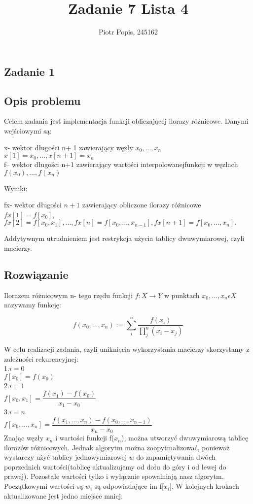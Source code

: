 \documentclass[11pt]{article}
\begin{document}
\title{Zadanie 7 Lista 4}
\author{Piotr Popis, 245162}
\maketitle
\centering

\begin{flushleft}
\section{Zadanie 1}
\subsection{Opis problemu}
Celem zadania jest implementacja funkcji obliczającej ilorazy różnicowe. Danymi wejściowymi są:
\begin{center}
x- wektor długości n+ 1 zawierający węzły $x_0, . . . , x_n$  $x[1]=x_0,...,x[n+1]=x_n$\\
f– wektor długości n+1 zawierający wartości interpolowanejfunkcji w węzłach $f(x_0), . . . , f(x_n)$\\
\begin{flushleft}
Wyniki:
\end{flushleft}
fx- wektor długości $n+1$ zawierający obliczone ilorazy różnicowe\\ $fx[1]=f[x_0]$,\\$fx[2]=f[x_0, x_1],...,fx[n]=f[x_0, . . . , x_{n−1}],fx[n+1]=f[x_0, . . . , x_n].$
\begin{flushleft}
Addytywnym utrudnieniem jest restrykcja użycia tablicy dwuwymiarowej, czyli macierzy.
\end{flushleft}
\end{center}
\subsection{Rozwiązanie}
Ilorazem różnicowym n- tego rzędu funkcji $f:X\longrightarrow Y$ w punktach $x_0, ..., x_n \epsilon X$ nazywamy funkcję:\\
\begin{center}
$$f(x_0,...,x_n) := \sum^n_i\dfrac{f(x_i)}{\prod^n_j(x_i-x_j)}$$
\end{center}
W celu realizacji zadania, czyli uniknięcia wykorzystania macierzy skorzystamy z zależności rekurencyjnej:\\
1.$i=0$\\
\quad$f[x_0]=f(x_0)$\\
2.$i=1$\\
\quad$f[x_0,x_1]=\dfrac{f(x_1)-f(x_0)}{x_1-x_0}$\\
3.$i=n$\\
\quad$f[x_0,...,x_n]=
\dfrac{f(x_1,...,x_n)-f(x_0,...,x_{n-1})}{x_n-x_0}$\\
Znając węzły $x_n$ i wartości funkcji f($x_n$), można utworzyć dwuwymiarową tablicę ilorazów różnicowych. Jednak algorytm można zoopytmalizować, ponieważ wystarczy użyć tablicy jednowymiarowej $w$ do zapamiętywania dwóch poprzednich wartości(tablicę aktualizujemy od dołu do góry i od lewej do prawej). Pozostałe wartości tylko i wyłącznie spowalniają nasz algorytm. Początkowymi wartości są $w_i$ są odpowiadające im f[$x_i$]. W kolejnych krokach aktualizowane jest jedno miejsce mniej.
\newpage

\end{flushleft}
\end{document}

